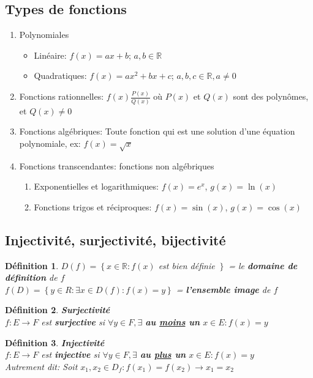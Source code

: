 \documentclass[10pt,a4paper]{book}
\newcommand{\R}{\mathbb{R}}
\newtheorem{definition}{Définition}[section]
\begin{document}
\subsection{Types de fonctions}
\begin{enumerate}
\item Polynomiales
\begin{itemize}
\item Linéaire: $f(x) = ax + b$; $a,b \in \R$
\item Quadratiques: $f(x) = ax^2 + bx + c$; $a,b,c \in \R, a \neq 0$
\end{itemize}
\item Fonctions rationnelles: $f(x) \frac{P(x)}{Q(x)}$ où $P(x)$ et $Q(x)$ sont des polynômes, et $Q(x) \neq 0$
\item Fonctions algébriques: Toute fonction qui est une solution d'une équation polynomiale, ex: $f(x) = \sqrt{x}$
\item Fonctions transcendantes: fonctions non algébriques
\begin{enumerate}
\item Exponentielles et logarithmiques: $f(x) = e^x$, $g(x) = \ln(x)$
\item Fonctions trigos et réciproques: $f(x) = \sin(x)$, $g(x) = \cos(x)$ 
\end{enumerate}
\end{enumerate}

\subsection{Injectivité, surjectivité, bijectivité}

\begin{definition}
$D(f) = \left\lbrace x \in \R: f(x) \right.$ est bien définie $\left. \right\rbrace$ = le \textbf{domaine de définition} de $f$ \\
$f(D) = \left\lbrace y \in R: \exists x \in D(f): f(x) = y \right\rbrace$ = \textbf{l'ensemble image} de $f$
\end{definition}

\begin{definition} \textbf{Surjectivité}\\
$f: E \rightarrow F$ est \textbf{surjective} si $\forall y \in F, \exists$ \textbf{au \underline{moins} un} $x\in E: f(x) = y$
\end{definition}

\begin{definition} \textbf{Injectivité}\\
$f: E \rightarrow F$ est \textbf{injective} si $\forall y \in F, \exists$ \textbf{au \underline{plus} un} $x\in E: f(x) = y$ \\
Autrement dit: Soit $x_1, x_2 \in D_f: f(x_1) = f(x_2) \rightarrow x_1 = x_2$
\end{definition}
\end{document}
